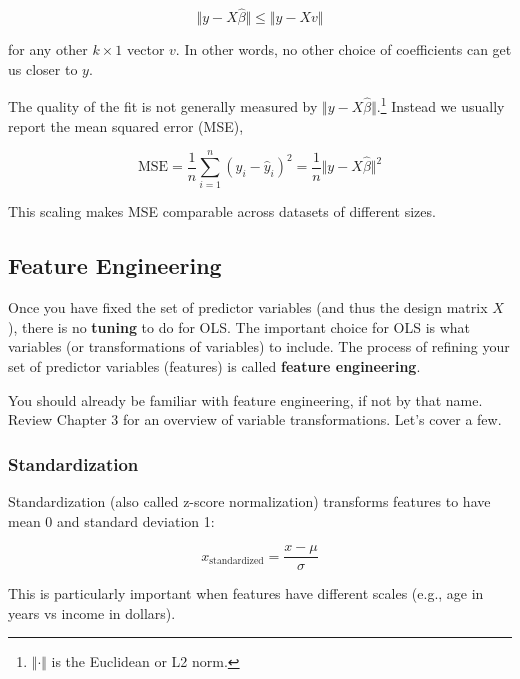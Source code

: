 \begin{equation}
\Vert y - X\hat{\beta} \Vert \leq \Vert y - Xv \Vert
\label{eq:orthogonal-projection}
\end{equation}

for any other $k \times 1$ vector $v$. In other words, no other choice of coefficients can get us closer to $y$.

The quality of the fit is not generally measured by $\Vert y - X\hat{\beta} \Vert$.\footnote{$\Vert \cdot \Vert$ is the Euclidean or L2 norm.} Instead we usually report the mean squared error (MSE),

\begin{equation}
\mathrm{MSE} = \frac{1}{n} \sum_{i=1}^n (y_i - \hat{y}_i)^2 = \frac{1}{n}\Vert y - X\hat{\beta} \Vert^2
\label{eq:mse-linear}
\end{equation}

This scaling makes MSE comparable across datasets of different sizes.

\subsection{Feature Engineering}

Once you have fixed the set of predictor variables (and thus the design matrix $X$), there is no \textbf{tuning} to do for OLS. The important choice for OLS is what variables (or transformations of variables) to include. The process of refining your set of predictor variables (features) is called \textbf{feature engineering}.

You should already be familiar with feature engineering, if not by that name. Review \cite{kuhn2013applied} Chapter 3 for an overview of variable transformations. Let's cover a few.

\subsubsection{Standardization}

Standardization (also called z-score normalization) transforms features to have mean 0 and standard deviation 1:

\begin{equation}
x_{\text{standardized}} = \frac{x - \mu}{\sigma}
\label{eq:standardization}
\end{equation}

This is particularly important when features have different scales (e.g., age in years vs income in dollars).


